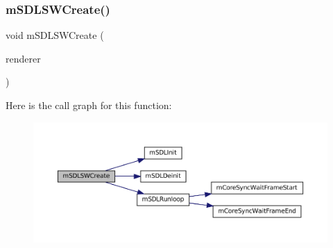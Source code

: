 \subsubsection{\texorpdfstring{m\+S\+D\+L\+S\+W\+Create()}{mSDLSWCreate()}}
{\footnotesize\ttfamily void m\+S\+D\+L\+S\+W\+Create (\begin{DoxyParamCaption}\item[{struct S\+D\+L\+Software\+Renderer $\ast$}]{renderer }\end{DoxyParamCaption})}

Here is the call graph for this function\+:
\nopagebreak
\begin{figure}[H]
\begin{center}
\leavevmode
\includegraphics[width=350pt]{pandora-sdl_8c_a272167ed06db7f73e361c3bfbd158698_cgraph}
\end{center}
\end{figure}
